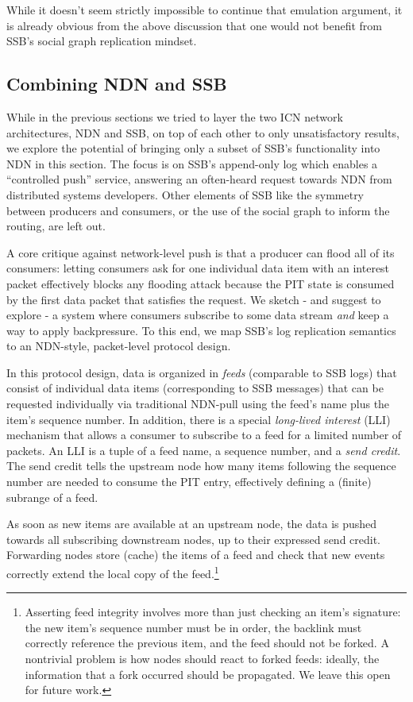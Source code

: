\documentclass[9pt,sigconf]{acmart}
\begin{document}
While it doesn't seem strictly impossible to continue that emulation
argument, it is already obvious from the above discussion that one
would not benefit from SSB's social graph replication mindset.


\subsection{Combining NDN and SSB}
\label{ssect:combining}

While in the previous sections we tried to layer the two ICN network
architectures, NDN and SSB, on top of each other to only
unsatisfactory results, we explore the potential of bringing only a
subset of SSB's functionality into NDN in this section. The focus is
on SSB's append-only log which enables a ``controlled push'' service,
answering an often-heard request towards NDN from distributed systems
developers. Other elements of SSB like the symmetry between producers
and consumers, or the use of the social graph to inform the routing,
are left out.

A core critique against network-level push is that a producer can
flood all of its consumers: letting consumers ask for one individual
data item with an interest packet effectively blocks any flooding
attack because the PIT state is consumed by the first data packet that
satisfies the request. We sketch - and suggest to explore - a system
where consumers subscribe to some data stream {\em and} keep a way to
apply backpressure. To this end, we map SSB's log replication
semantics to an NDN-style, packet-level protocol design.

In this protocol design, data is organized in \textit{feeds}
(comparable to SSB logs) that consist of individual data items
(corresponding to SSB messages) that can be requested individually via
traditional NDN-pull using the feed's name plus the item's sequence
number.  In addition, there is a special \textit{long-lived interest}
(LLI) mechanism that allows a consumer to subscribe to a feed for a
limited number of packets. An LLI is a tuple of a feed name, a
sequence number, and a \textit{send credit}.  The send credit tells
the upstream node how many items following the sequence number are
needed to consume the PIT entry, effectively defining a (finite)
subrange of a feed.

As soon as new items are available at an upstream node, the data is
pushed towards all subscribing downstream nodes, up to their expressed
send credit. Forwarding nodes store (cache) the items of a feed and
check that new events correctly extend the local copy of the
feed.\footnote{ Asserting feed integrity involves more than just
  checking an item's signature: the new item's sequence number must be
  in order, the backlink must correctly reference the previous item,
  and the feed should not be forked. A nontrivial problem is how nodes
  should react to forked feeds: ideally, the information that a fork
  occurred should be propagated. We leave this open for future work.}
\end{document}
